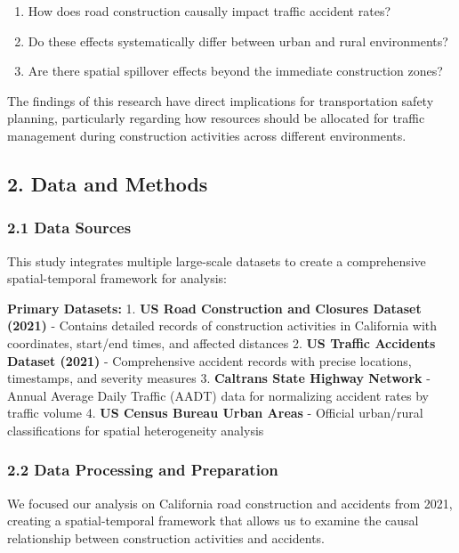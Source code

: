 \documentclass[
]{article}
\providecommand{\tightlist}{%
  \setlength{\itemsep}{0pt}\setlength{\parskip}{0pt}}
\begin{document}
\begin{enumerate}
\def\labelenumi{\arabic{enumi}.}
\tightlist
\item
  How does road construction causally impact traffic accident rates?
\item
  Do these effects systematically differ between urban and rural
  environments?
\item
  Are there spatial spillover effects beyond the immediate construction
  zones?
\end{enumerate}

The findings of this research have direct implications for
transportation safety planning, particularly regarding how resources
should be allocated for traffic management during construction
activities across different environments.

\subsection{2. Data and Methods}\label{data-and-methods}

\subsubsection{2.1 Data Sources}\label{data-sources}

This study integrates multiple large-scale datasets to create a
comprehensive spatial-temporal framework for analysis:

\textbf{Primary Datasets:} 1. \textbf{US Road Construction and Closures
Dataset (2021)} - Contains detailed records of construction activities
in California with coordinates, start/end times, and affected distances
2. \textbf{US Traffic Accidents Dataset (2021)} - Comprehensive accident
records with precise locations, timestamps, and severity measures 3.
\textbf{Caltrans State Highway Network} - Annual Average Daily Traffic
(AADT) data for normalizing accident rates by traffic volume 4.
\textbf{US Census Bureau Urban Areas} - Official urban/rural
classifications for spatial heterogeneity analysis

\subsubsection{2.2 Data Processing and
Preparation}\label{data-processing-and-preparation}

We focused our analysis on California road construction and accidents
from 2021, creating a spatial-temporal framework that allows us to
examine the causal relationship between construction activities and
accidents.
\end{document}
